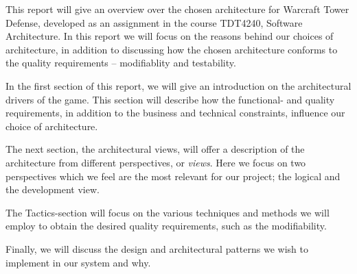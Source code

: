 This report will give an overview over the chosen architecture for Warcraft Tower Defense, developed as an assignment in the course TDT4240, Software Architecture.
In this report we will focus on the reasons behind our choices of architecture, in addition to discussing how the chosen architecture conforms to the quality requirements -- modifiablity and testability. 

In the first section of this report, we will give an introduction on the architectural drivers of the game. This section will describe how the functional- and quality requirements, in addition to the business and technical constraints, influence our choice of architecture. 

The next section, the architectural views, will offer a description of the architecture from different perspectives, or \emph{views}. Here we focus on two perspectives which we feel are the most relevant for our project; the logical and the development view.

The Tactics-section will focus on the various techniques and methods we will employ to obtain the desired quality requirements, such as the modifiability.


Finally, we will discuss the design and architectural patterns we wish to implement in our system and why.
